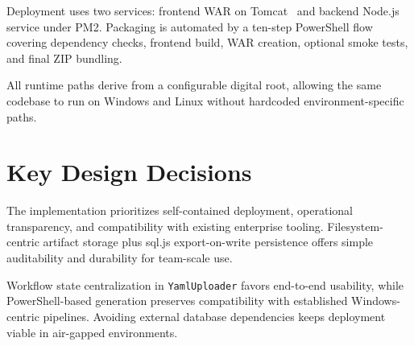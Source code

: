 Deployment uses two services: frontend WAR on Tomcat~\cite{tomcat_docs} and backend Node.js service under PM2. Packaging is automated by a ten-step PowerShell flow covering dependency checks, frontend build, WAR creation, optional smoke tests, and final ZIP bundling.

All runtime paths derive from a configurable digital root, allowing the same codebase to run on Windows and Linux without hardcoded environment-specific paths.

\section{Key Design Decisions}

The implementation prioritizes self-contained deployment, operational transparency, and compatibility with existing enterprise tooling. Filesystem-centric artifact storage plus sql.js export-on-write persistence offers simple auditability and durability for team-scale use.

Workflow state centralization in \texttt{YamlUploader} favors end-to-end usability, while PowerShell-based generation preserves compatibility with established Windows-centric pipelines. Avoiding external database dependencies keeps deployment viable in air-gapped environments.
